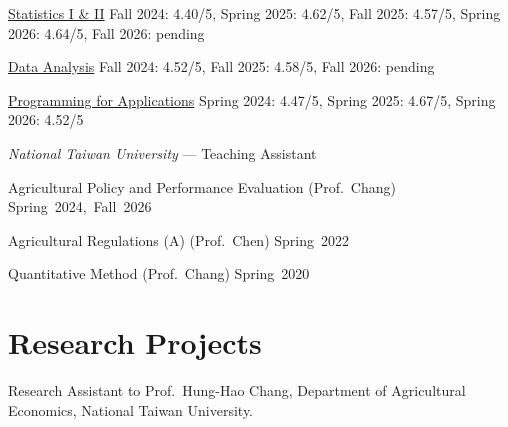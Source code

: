 \documentclass[11pt,letterpaper]{article}
\begin{document}
\href{https://yyliou.github.io/stat}{Statistics I \& II} \newline Fall
2024: 4.40/5, Spring 2025: 4.62/5, Fall 2025: 4.57/5, Spring 2026:
4.64/5, Fall 2026: pending

\href{https://yyliou.github.io/da}{Data Analysis} \newline Fall 2024:
4.52/5, Fall 2025: 4.58/5, Fall 2026: pending

\href{https://yyliou.github.io/pa}{Programming for Applications}
\newline Spring 2024: 4.47/5, Spring 2025: 4.67/5, Spring 2026: 4.52/5

\emph{National Taiwan University} --- Teaching Assistant

Agricultural Policy and Performance Evaluation (Prof.~Chang)
\hfill \mbox{Spring 2024, Fall 2026}

Agricultural Regulations (A) (Prof.~Chen) \hfill \mbox{Spring 2022}

Quantitative Method (Prof.~Chang) \hfill \mbox{Spring 2020}

\section{Research Projects}\label{research-projects}

Research Assistant to Prof.~Hung-Hao Chang, Department of Agricultural
Economics, National Taiwan University.
\end{document}
